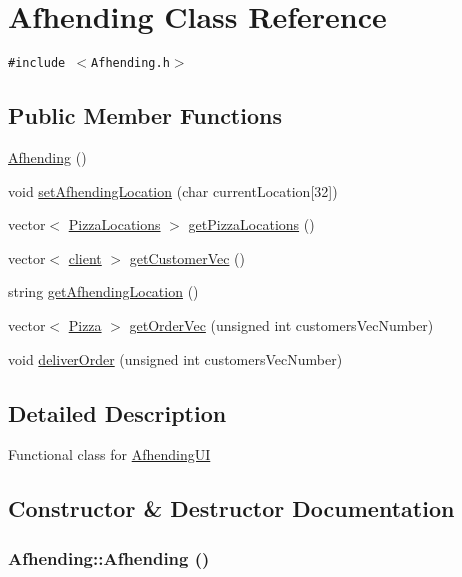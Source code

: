 \hypertarget{class_afhending}{
\section{Afhending Class Reference}
\label{class_afhending}
}
{\tt \#include $<$Afhending.h$>$}

\subsection*{Public Member Functions}
\begin{CompactItemize}
\item 
\hyperlink{class_afhending_9365433a6f973ad929ffc0b458bc7c6f}{Afhending} ()
\item 
void \hyperlink{class_afhending_411cc45b50d4a59a33d76f6c54e52f78}{set\-Afhending\-Location} (char current\-Location\mbox{[}32\mbox{]})
\item 
vector$<$ \hyperlink{class_pizza_locations}{Pizza\-Locations} $>$ \hyperlink{class_afhending_3d38e7498fba59674c7d3838bf4c1824}{get\-Pizza\-Locations} ()
\item 
vector$<$ \hyperlink{classclient}{client} $>$ \hyperlink{class_afhending_3970b0afe27b514282442b11592e1602}{get\-Customer\-Vec} ()
\item 
string \hyperlink{class_afhending_543bc751e47e95a5382a13e161387a1b}{get\-Afhending\-Location} ()
\item 
vector$<$ \hyperlink{class_pizza}{Pizza} $>$ \hyperlink{class_afhending_ad0cbeddec394b25c5eade57247f4110}{get\-Order\-Vec} (unsigned int customers\-Vec\-Number)
\item 
void \hyperlink{class_afhending_1d223b1559fc42935dfef28841735951}{deliver\-Order} (unsigned int customers\-Vec\-Number)
\end{CompactItemize}


\subsection{Detailed Description}
Functional class for \hyperlink{class_afhending_u_i}{Afhending\-UI} 



\subsection{Constructor \& Destructor Documentation}
\hypertarget{class_afhending_9365433a6f973ad929ffc0b458bc7c6f}{
\subsubsection[Afhending]{\setlength{\rightskip}{0pt plus 5cm}Afhending::Afhending ()}}
\label{class_afhending_9365433a6f973ad929ffc0b458bc7c6f}


